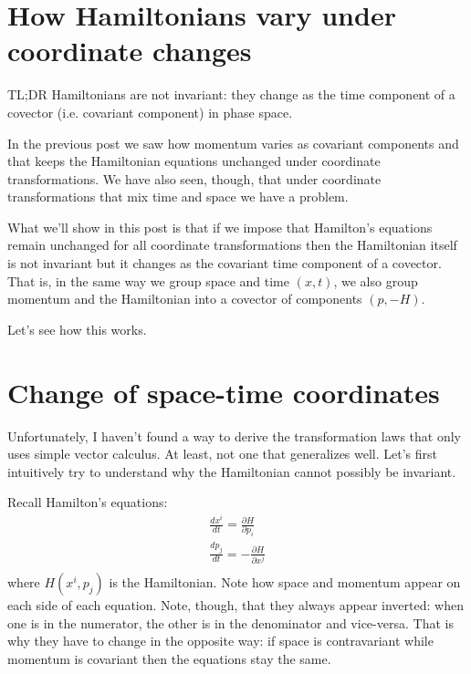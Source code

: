 \documentclass[aps,pra,10pt,floatfix,nofootinbib]{revtex4-1}
\theoremstyle{definition}
\begin{document}
\section{How Hamiltonians vary under coordinate changes}

TL;DR Hamiltonians are not invariant: they change as the time component of a covector (i.e. covariant component) in phase space.

In the previous post we saw how momentum varies as covariant components and that keeps the Hamiltonian equations unchanged under coordinate transformations. We have also seen, though, that under coordinate transformations that mix time and space we have a problem.

What we'll show in this post is that if we impose that Hamilton's equations remain unchanged for all coordinate transformations then the Hamiltonian itself is not invariant but it changes as the covariant time component of a covector. That is, in the same way we group space and time $(x, t)$, we also group momentum and the Hamiltonian into a covector of components $(p, -H)$.

Let's see how this works.

\section{Change of space-time coordinates}

Unfortunately, I haven't found a way to derive the transformation laws that only uses simple vector calculus. At least, not one that generalizes well. Let's first intuitively try to understand why the Hamiltonian cannot possibly be invariant.

Recall Hamilton's equations:
\begin{equation}
\begin{aligned}
\frac{dx^i}{dt} = \frac{\partial H}{\partial p_i}  \\
\frac{dp_j}{dt} = - \frac{\partial H}{\partial x^j}  \\
\end{aligned}
\label{Hamilton}
\end{equation}
where $H(x^i,p_j)$ is the Hamiltonian. Note how space and momentum appear on each side of each equation. Note, though, that they always appear inverted: when one is in the numerator, the other is in the denominator and vice-versa. That is why they have to change in the opposite way: if space is contravariant while momentum is covariant then the equations stay the same.
\end{document}

